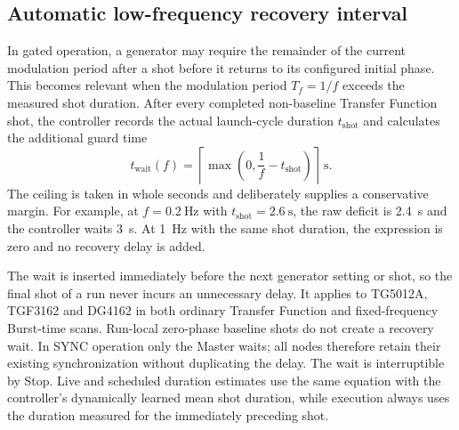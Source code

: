 \documentclass[11pt,oneside,openany]{book}
\begin{document}
\subsection{Automatic low-frequency recovery interval}
In gated operation, a generator may require the remainder of the current modulation period
after a shot before it returns to its configured initial phase. This becomes relevant when
the modulation period $T_f=1/f$ exceeds the measured shot duration. After every completed
non-baseline Transfer Function shot, the controller records the actual launch-cycle duration
$t_{\mathrm{shot}}$ and calculates the additional guard time
\begin{equation}
  \boxed{t_{\mathrm{wait}}(f)=
  \left\lceil\max\!\left(0,\frac{1}{f}-t_{\mathrm{shot}}\right)\right\rceil\ \si{\second}.}
  \label{eq:transfer-low-frequency-recovery}
\end{equation}
The ceiling is taken in whole seconds and deliberately supplies a conservative margin. For
example, at $f=\SI{0.2}{\hertz}$ with $t_{\mathrm{shot}}=\SI{2.6}{\second}$, the raw deficit
is \SI{2.4}{\second} and the controller waits \SI{3}{\second}. At \SI{1}{\hertz} with the
same shot duration, the expression is zero and no recovery delay is added.

The wait is inserted immediately before the next generator setting or shot, so the final
shot of a run never incurs an unnecessary delay. It applies to TG5012A, TGF3162 and DG4162
in both ordinary Transfer Function and fixed-frequency Burst-time scans. Run-local
zero-phase baseline shots do not create a recovery wait. In SYNC operation only the Master
waits; all nodes therefore retain their existing synchronization without duplicating the
delay. The wait is interruptible by Stop. Live and scheduled duration estimates use the
same equation with the controller's dynamically learned mean shot duration, while execution
always uses the duration measured for the immediately preceding shot.
\end{document}
